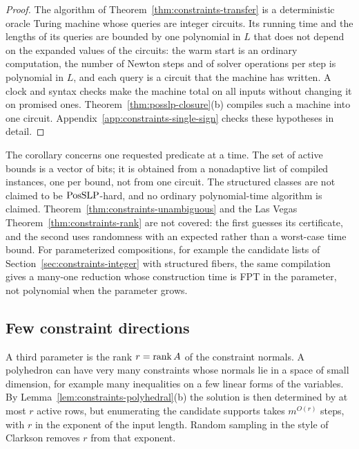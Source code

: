 \begin{proof}
The algorithm of Theorem~\ref{thm:constraints-transfer} is a deterministic
oracle Turing machine whose queries are integer circuits. Its running time
and the lengths of its queries are bounded by one polynomial in $L$ that does
not depend on the expanded values of the circuits: the warm start is an
ordinary computation, the number of Newton steps and of solver operations per
step is polynomial in $L$, and each query is a circuit that the machine has
written. A clock and syntax checks make the machine total on all inputs
without changing it on promised ones.
Theorem~\ref{thm:posslp-closure}(b) compiles such a machine into one circuit.
Appendix~\ref{app:constraints-single-sign} checks these hypotheses in detail.
\end{proof}

The corollary concerns one requested predicate at a time. The set of active
bounds is a vector of bits; it is obtained from a nonadaptive list of compiled
instances, one per bound, not from one circuit. The structured classes are not
claimed to be $\mathrm{PosSLP}$-hard, and no ordinary polynomial-time algorithm is
claimed. Theorem~\ref{thm:constraints-unambiguous} and the Las Vegas
Theorem~\ref{thm:constraints-rank} are not covered: the first guesses its
certificate, and the second uses randomness with an expected rather than a
worst-case time bound. For parameterized compositions, for example the
candidate lists of Section~\ref{sec:constraints-integer} with structured
fibers, the same compilation gives a many-one reduction whose construction
time is FPT in the parameter, not polynomial when the parameter grows.

\subsection{Few constraint directions}
\label{sec:constraints-rank}

A third parameter is the rank $r=\operatorname{rank} A$ of the constraint normals. A
polyhedron can have very many constraints whose normals lie in a space of
small dimension, for example many inequalities on a few linear forms of the
variables. By Lemma~\ref{lem:constraints-polyhedral}(b) the solution is then
determined by at most $r$ active rows, but enumerating the candidate supports
takes $m^{O(r)}$ steps, with $r$ in the exponent of the input length.
Random sampling in the style of Clarkson removes $r$ from that exponent.

